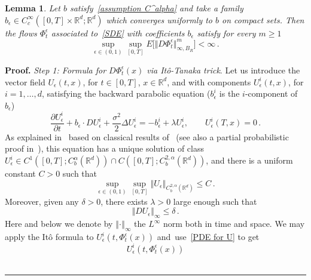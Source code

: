 \documentclass[a4paper,10pt]{article}
\newtheorem{lemma}[theorem]{Lemma}
\newenvironment{proof}[1][Proof]{\noindent\textbf{#1.} }{\ \rule{0.5em}{0.5em}}
\newcommand{\eps}{\epsilon}
\begin{document}
\begin{lemma}
Let $b$ satisfy~\eqref{assumption C^alpha} and take a family $b_{\epsilon}\in C_{c}^{\infty}([0,T]  \times\mathbb{R}^{d};\mathbb{R}^{d})$ which converges uniformly to $b$ on compact sets. Then the flows $\Phi^{\eps}_t$
associated to~\eqref{SDE} with coefficients $b_{\epsilon}$ satisfy for every $m\geq 1$
\begin{equation}
\sup_{\epsilon\in (0,1)  }\sup_{[0,T]  }E\Big[ \Vert D\Phi^{\eps}_t \Vert_{\infty,B_R
}^{m} \Big]  <\infty \,.\label{flow estimate} 
\end{equation}
\end{lemma}

\begin{proof}
\emph{Step 1: Formula for $D \Phi^{\eps}_t(x)$ via It\^o-Tanaka trick}. Let us introduce the vector field $U_{\epsilon}(
t,x)  $, for $t\in [0,T]$, $x\in\mathbb{R}^{d}$, and with
components $U_{\epsilon}^{i}(t,x)$, for $i=1,\ldots,d$, satisfying the
backward parabolic equation ($b_{\epsilon}^{i}$ is the $i$-component of
$b_{\epsilon}$)
\begin{equation}
\frac{\partial U_{\epsilon}^{i}}{\partial t}+b_{\epsilon}\cdot DU_{\epsilon
}^{i}+\frac{\sigma^2}{2}\Delta U_{\epsilon}^{i}=-b_{\epsilon}^{i}+\lambda
U_{\epsilon}^{i},\qquad U_{\epsilon}^{i}(  T,x)
=0 \, .\label{PDE for U} 
\end{equation}
As explained in~\cite[Section~2]{FLAGUBPRI10} based on classical results of~\cite{Kr} (see also a partial probabilistic proof in~\cite{FLALNM}), this equation has a unique
solution of class $U_{\epsilon}^{i}\in C^{1}( [0,T]
;C_{b}^{\alpha}(\mathbb{R}^{d}))  \cap C([0,T];C_{b}^{2,\alpha}(\mathbb{R}^{d}))$, and there is a uniform constant $C>0$ such that
\begin{equation}
\sup_{\eps \in (0,1)} \sup_{[0,T]  }\left\Vert U_{\epsilon}\right\Vert _{C_{b} 
^{2,\alpha}(  \mathbb{R}^{d})  }\leq
C \, .\label{uniform estimate on U} 
\end{equation}
Moreover, given any $\delta>0$, there exists $\lambda>0$ large enough such
that
\begin{equation}
\left\Vert DU_{\epsilon}\right\Vert _{\infty}\leq\delta \, .\label{uniform estimate on U 1/2} 
\end{equation}
Here and below we denote by $\left\Vert \cdot\right\Vert _{\infty}$ the
$L^{\infty}$ norm both in time and space. We may apply the It\^{o} formula to
$U_{\epsilon}^{i}(  t,\Phi^{\eps}_t(x)  )  $
and\ use~\eqref{PDE for U} to get 
\[
U_{\epsilon}^{i} (  t,\Phi^{\eps}_t(x) )
\]
\end{proof}
\end{document}
